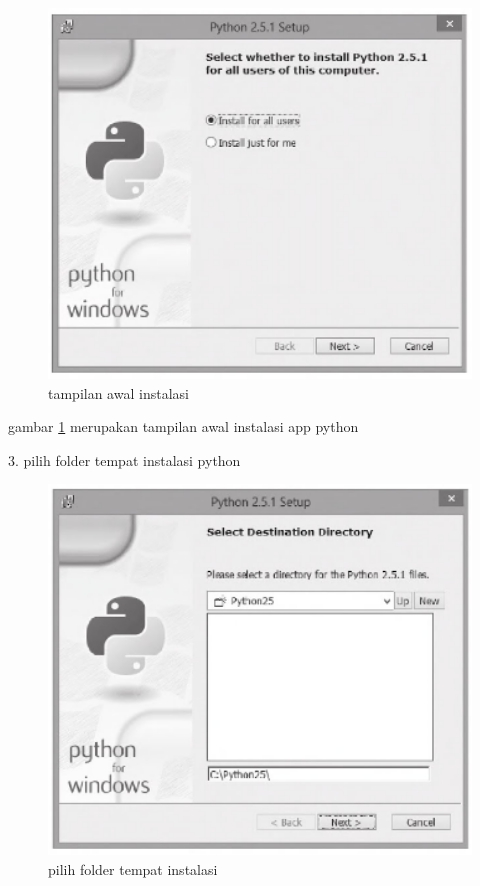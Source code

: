 	\begin{figure}[ht]
	\centerline{\includegraphics[width=1\textwidth]{figures/awal.PNG}}
	\caption{tampilan awal instalasi}
	\label{awal}
	\end{figure}
	
	gambar \ref {awal} merupakan tampilan awal instalasi app python
	
	3. pilih folder tempat instalasi python
	
	\begin{figure}[ht]
	\centerline{\includegraphics[width=1\textwidth]{figures/folder.PNG}}
	\caption{pilih folder tempat instalasi}
	\label{folder}
	\end{figure}
	
